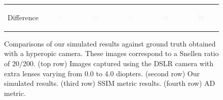 \begin{figure}[!t]
\begin{tabular}{@{}r@{ } c@{ } c@{ } c@{ } c@{ } c }
	\begin{sideways} \parbox[b]{20mm} {Difference} \end{sideways} &
	\includegraphics[width=0.185\textwidth]{__Images/05/BW_N(20-200)_-0D_to_-4D/bw_N_20-200_Camera-0,00D(diff).png} &
	\includegraphics[width=0.185\textwidth]{__Images/05/BW_N(20-200)_-0D_to_-4D/bw_N_20-200_Camera-1,00D(diff).png} &
	\includegraphics[width=0.185\textwidth]{__Images/05/BW_N(20-200)_-0D_to_-4D/bw_N_20-200_Camera-2,00D(diff).png} &
	\includegraphics[width=0.185\textwidth]{__Images/05/BW_N(20-200)_-0D_to_-4D/bw_N_20-200_Camera-3,00D(diff).png} &
	\includegraphics[width=0.185\textwidth]{__Images/05/BW_N(20-200)_-0D_to_-4D/bw_N_20-200_Camera-4,00D(diff).png} \\

	\end{tabular}
	
	\caption[Comparisons of our simulated results against ground truth obtained with a hyperopic camera]{Comparisons of our simulated results against ground truth obtained with a hyperopic camera. These images correspond to a Snellen ratio of 20/200. (top row) Images captured using the DSLR camera with extra lenses varying from 0.0 to 4.0 diopters. (second row) Our simulated results. (third row) SSIM metric results. (fourth row) AD metric.}
	\label{fig:comparison_hyperopic_bw}
\end{figure}
